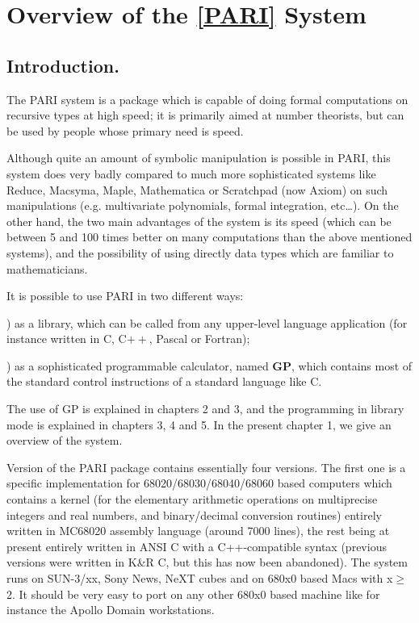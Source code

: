 \chapter{Overview of the {\bf \ref{PARI}} System}

\section{Introduction.}

The PARI system is a package which is capable of doing formal computations
on recursive types at high speed; it is primarily aimed at number
theorists, but can be used by people whose primary need is speed.

Although quite an amount of symbolic manipulation is possible in PARI, this
system does very badly compared to much more sophisticated systems like
Reduce, Macsyma, Maple, Mathematica or Scratchpad (now Axiom) on such
manipulations (e.g. multivariate
polynomials, formal integration, etc\dots). On the other hand, the two
main advantages of the system is its speed (which can be between 5 and
100 times better on many computations than the above mentioned systems),
and the possibility of using directly data types which are familiar
to mathematicians.

It is possible to use PARI in two different ways:

) as a library, which can be called from any upper-level language
application (for instance written in C, C$++$, Pascal or Fortran);

) as a sophisticated programmable calculator, named {\bf GP}, which
contains most of the standard control instructions of a standard language
like C.

The use of GP is explained in chapters 2 and 3, and the programming in library
mode is explained in chapters 3, 4 and 5. In the present chapter 1, we give
an overview of the system.


Version \vers{} of the PARI package contains essentially four versions. The 
first one is a specific implementation for 68020/68030/68040/68060 based
computers which contains a kernel (for
the elementary arithmetic operations on multiprecise integers and real numbers,
and binary/decimal conversion routines) entirely  written in MC68020 assembly
language (around 7000 lines), the rest being at present entirely written in 
ANSI C with a C++-compatible syntax (previous versions were written in K\&R C,
but this has now been abandoned).
The system runs on SUN-3/xx, Sony News, NeXT cubes and on 680x0 based
Macs with x$\ge$2. It should be very easy to port on any other 680x0 based
machine like for instance the Apollo Domain workstations.

